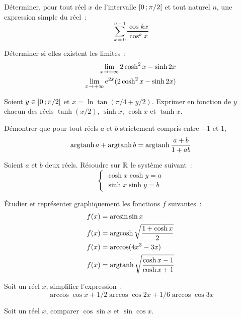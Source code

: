 \begin{exercice}
    Déterminer, pour tout réel \(x\) de l'intervalle \(\left[ 0 \, ;  \pi/2 \right[\) 
    et tout naturel \(n\), une expression simple du réel~:
    \begin{equation}
        \sum_{k=0}^{n-1} \frac{\cos kx}{\cos^k x}
    \end{equation}
\end{exercice}
\begin{exercice}
    Déterminer si elles existent les limites~:
    \begin{align}
        \lim\limits_{x \to +\infty} 2\cosh^2x-\sinh 2x \\
        \lim\limits_{x \to +\infty} \operatorname{e}^{2x}(2\cosh^2x-\sinh 2x)
    \end{align}
\end{exercice}
\begin{exercice}
    Soient \(y \in \left] 0 \, ;  \pi/2 \right[\) et \(x = \ln\tan(\pi/4+y/2)\). 
    Exprimer en fonction de \(y\) chacun des réels \(\tanh(x/2)\), \(\sinh x\), 
    \(\cosh x\) et \(\tanh x\).
\end{exercice}
\begin{exercice}
    Démontrer que pour tout réels \(a\) et \(b\) strictement compris entre 
    \(-1\) et \(1\),
    \begin{equation}
        \operatorname{argtanh} a + \operatorname{argtanh} b = \operatorname{argtanh} \frac{a+b}{1+ab}
    \end{equation}
\end{exercice}
\begin{exercice}
    Soient \(a\) et \(b\) deux réels. Résoudre sur \(\mathbb{R}\) le système suivant~:
    \begin{equation}
        \begin{cases} \cosh x \cosh y = a \\ \sinh x \sinh y = b \end{cases}
    \end{equation}
\end{exercice}
\begin{exercice}
    Étudier et représenter graphiquement les fonctions \(f\) suivantes~:
    \begin{align}
        f(x) &= \arcsin \sin x \\
        f(x) &= \operatorname{argcosh} \sqrt{\frac{1+\cosh x}{2}} \\
        f(x) &= \arccos(4x^3-3x) \\
        f(x) &= \operatorname{argtanh}\sqrt{\frac{\cosh x - 1}{\cosh x + 1}}
    \end{align}
\end{exercice}
\begin{exercice}
    Soit un réel \(x\), simplifier l'expression~:
    \begin{equation}
        \arccos \cos x + 1/2 \arccos\cos 2x + 1/6\arccos\cos 3x
    \end{equation}
\end{exercice}
\begin{exercice}
    Soit un réel \(x\), comparer \(\cos\sin x\) et \(\sin\cos x\).
\end{exercice}
